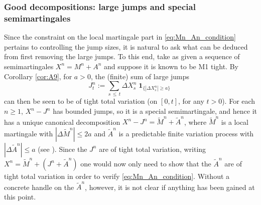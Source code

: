 \documentclass[11pt]{article}
\theoremstyle{definition}\newtheorem{example}[theorem]{Example}
\theoremstyle{definition}\newtheorem{counterexample}[theorem]{Counterexample}
\theoremstyle{definition}\newtheorem{remark}[theorem]{Remark}
\theoremstyle{definition}\newtheorem{defi}[theorem]{Definition}
\numberwithin{equation}{section}
\newcommand{\ind}{\operatorname{\mathbf{1}}}							%
\renewcommand{\|}{\; : \, \;}											%
\begin{document}
\subsubsection{Good decompositions: large jumps and special semimartingales}\label{sect:GD_special_semi}

Since the constraint on the local martingale part in \eqref{eq:Mn_An_condition} pertains to controlling the jump sizes, it is natural to ask what can be deduced from first removing the large jumps. To this end, take as given a sequence of semimartingales $X^n=M^n+A^n$ and suppose it is known to be M1 tight. By Corollary \ref{cor:A9}, for $a>0$, the (finite) sum of large jumps
\[
J^n_t:=\sum_{s\, \le \, t} \Delta X^n_s \ind_{\{|\Delta X^n_s|\ge  a\}}
\]
can then be seen to be of tight total variation (on $[0,t]$, for any $t>0$). For each $n\geq 1$, $X^n-J^n$ has bounded jumps, so it is a special semimartingale, and hence it has a unique canonical decomposition $X^n-J^n =\tilde{M}^n + \tilde{A}^n$,
where $\tilde{M}^n$ is a local martingale with $|\Delta \tilde{M}^n|\le 2a$ and $\tilde{A}^n$ is a predictable finite variation process with $|\Delta \tilde{A}^n|\le a$ (see \cite[Lem.~I.4.24]{shiryaev}). Since the $J^n$ are of tight total variation, writing $X^n = \tilde{M}^n+(J^n+\tilde{A}^n)$ one would now only need to show that the $\tilde{A}^n$ are of tight total variation in order to verify \eqref{eq:Mn_An_condition}. Without a concrete handle on the $\tilde{A}^n$, however, it is not clear if anything has been gained at this point.
\end{document}
